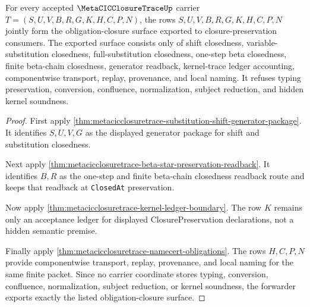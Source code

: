 \begin{theorem}
\label{thm:metacicclosuretrace-obligation-closure-forwarder}
For every accepted $\MetaCICClosureTraceUp$ carrier $T=(S,U,V,B,R,G,K,H,C,P,N)$, the rows $S,U,V,B,R,G,K,H,C,P,N$ jointly form the obligation-closure surface exported to closure-preservation consumers. The exported surface consists only of shift closedness, variable-substitution closedness, full-substitution closedness, one-step beta closedness, finite beta-chain closedness, generator readback, kernel-trace ledger accounting, componentwise transport, replay, provenance, and local naming. It refuses typing preservation, conversion, confluence, normalization, subject reduction, and hidden kernel soundness.
\end{theorem}
\begin{proof}
First apply \autoref{thm:metacicclosuretrace-substitution-shift-generator-package}. It identifies $S,U,V,G$ as the displayed generator package for shift and substitution closedness.

Next apply \autoref{thm:metacicclosuretrace-beta-star-preservation-readback}. It identifies $B,R$ as the one-step and finite beta-chain closedness readback route and keeps that readback at \texttt{ClosedAt} preservation.

Now apply \autoref{thm:metacicclosuretrace-kernel-ledger-boundary}. The row $K$ remains only an acceptance ledger for displayed ClosurePreservation declarations, not a hidden semantic premise.

Finally apply \autoref{thm:metacicclosuretrace-namecert-obligations}. The rows $H,C,P,N$ provide componentwise transport, replay, provenance, and local naming for the same finite packet. Since no carrier coordinate stores typing, conversion, confluence, normalization, subject reduction, or kernel soundness, the forwarder exports exactly the listed obligation-closure surface.
\end{proof}

